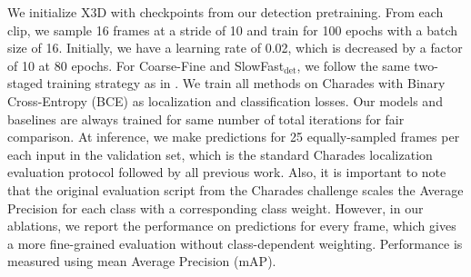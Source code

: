 \documentclass[letterpaper]{article} \usepackage{aaai23}  \usepackage{times}  \usepackage{helvet}  \usepackage{courier}  \usepackage[hyphens]{url}  \usepackage{graphicx} \urlstyle{rm} \def\UrlFont{\rm}  \usepackage{natbib}  \usepackage{caption} \frenchspacing  \setlength{\pdfpagewidth}{8.5in}  \setlength{\pdfpageheight}{11in}  \usepackage{algorithm}
\newcommand{\ch}{}
\begin{document}
We initialize X3D \cite{feichtenhofer2020x3d} with checkpoints from our detection pretraining. From each clip, we sample 16 frames at a stride of 10 and train for 100 epochs with a batch size of 16. Initially, we have a learning rate of 0.02, which is decreased by a factor of 10 at 80 epochs. For Coarse-Fine and SlowFast$_\text{det}$, we follow the same two-staged training strategy as in \cite{kahatapitiya2021coarse}. 
We train all methods on Charades with Binary Cross-Entropy (BCE) as localization and classification losses. \ch{Our models and baselines are always trained for same number of total iterations for fair comparison.} At inference, we make predictions for 25 equally-sampled frames per each input in the validation set, which is the standard Charades localization evaluation protocol \cite{sigurdsson2016hollywood} followed by all previous work. Also, it is important to note that the original evaluation script from the Charades challenge scales the Average Precision for each class with a corresponding class weight. However, in our ablations, we report the performance on predictions for every frame, which gives a more fine-grained evaluation without class-dependent weighting. Performance is measured using mean Average Precision (mAP).
\end{document}
